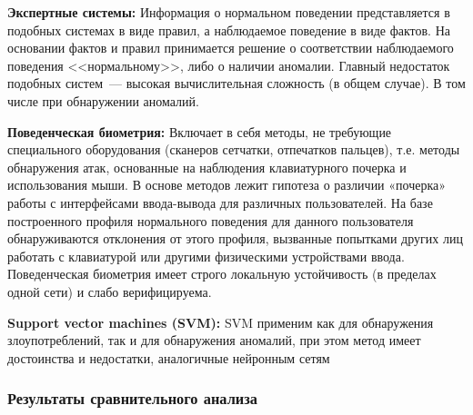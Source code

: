 \textbf{Экспертные системы:} Информация о нормальном поведении представляется в подобных системах в виде правил, а наблюдаемое поведение в виде фактов. На основании фактов и правил принимается решение о соответствии наблюдаемого поведения <<нормальному>>, либо о наличии аномалии. Главный недостаток подобных систем~--- высокая вычислительная сложность (в общем случае). В том числе при обнаружении аномалий. 

\textbf{Поведенческая биометрия:} Включает в себя методы, не требующие специального оборудования (сканеров сетчатки, отпечатков пальцев), т.е. методы обнаружения атак, основанные на наблюдения клавиатурного почерка и использования мыши. В основе методов лежит гипотеза о различии «почерка» работы с интерфейсами ввода-вывода для различных пользователей. На базе построенного профиля нормального поведения для данного пользователя обнаруживаются отклонения от этого профиля, вызванные попытками других лиц работать с клавиатурой или другими физическими устройствами ввода. Поведенческая биометрия имеет строго локальную устойчивость (в пределах одной сети) и слабо верифицируема.

\textbf{Support vector machines (SVM):} SVM применим как для обнаружения злоупотреблений, так и для обнаружения аномалий, при этом метод имеет достоинства и недостатки, аналогичные нейронным сетям

\newcommand{\specialcell}[2][c]{%
  \begin{tabular}[#1]{@{}c@{}}#2\end{tabular}}

\subsubsection{Результаты сравнительного анализа}

